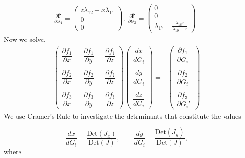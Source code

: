\documentclass{svjour3}
\begin{document}
{\footnotesize
\begin{align*}
\frac{\partial  \bar{\textbf{F}} }{\partial G_4}= 
\begin{pmatrix}
z \lambda_{12}-x \lambda_{11} \\
0\\
0
\end{pmatrix}, \
\frac{\partial  \bar{\textbf{F}} }{\partial G_2}= 
\begin{pmatrix}
0\\
0\\
\lambda_{17} - \frac{\lambda_{18}z}{\lambda_{19} + z}
\end{pmatrix}. \
\end{align*}
}
Now we solve,
{\footnotesize
\begin{align*}
\begin{pmatrix}
\dfrac{\partial f_1}{\partial x} && \dfrac{\partial f_1}{\partial y} && \dfrac{\partial f_1}{\partial z} \\
\\
\dfrac{\partial f_2}{\partial x} && \dfrac{\partial f_2}{\partial y} && \dfrac{\partial f_2}{\partial z} \\
\\
\dfrac{\partial f_3}{\partial x} && \dfrac{\partial f_3}{\partial y} && \dfrac{\partial f_3}{\partial z}
\end{pmatrix}
\begin{pmatrix}
\dfrac{d x}{d G_i}\\ 
\\
\dfrac{d y}{d G_i} \\
\\
\dfrac{d z}{d G_i}
\end{pmatrix} =
- \begin{pmatrix}
\dfrac{\partial f_1}{\partial G_i}\\ 
\\
\dfrac{\partial f_2}{\partial G_i} \\
\\
\dfrac{\partial f_3}{\partial G_i},
\end{pmatrix}
\end{align*}
}
We use Cramer's Rule to investigate the detrminants that constitute the values \par
$$ \frac{d x}{d G_i}=\frac{\text{Det}(J_x)}{\text{Det}(J)}, \qquad \frac{d y}{dG_i}=\frac{\text{Det}(J_y)}{\text{Det}(J)},$$
where
\end{document}
